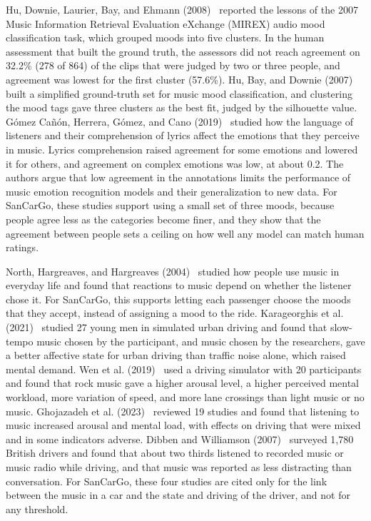 Hu, Downie, Laurier, Bay, and Ehmann (2008)~\cite{hu2008mirex} reported the lessons of the 2007 Music Information Retrieval Evaluation eXchange (MIREX) audio mood classification task, which grouped moods into five clusters. In the human assessment that built the ground truth, the assessors did not reach agreement on 32.2\% (278 of 864) of the clips that were judged by two or three people, and agreement was lowest for the first cluster (57.6\%). Hu, Bay, and Downie (2007)~\cite{hu2007simplified} built a simplified ground-truth set for music mood classification, and clustering the mood tags gave three clusters as the best fit, judged by the silhouette value. G{\'o}mez Ca{\~n}{\'o}n, Herrera, G{\'o}mez, and Cano (2019)~\cite{gomez2019emotions} studied how the language of listeners and their comprehension of lyrics affect the emotions that they perceive in music. Lyrics comprehension raised agreement for some emotions and lowered it for others, and agreement on complex emotions was low, at about 0.2. The authors argue that low agreement in the annotations limits the performance of music emotion recognition models and their generalization to new data. For SanCarGo, these studies support using a small set of three moods, because people agree less as the categories become finer, and they show that the agreement between people sets a ceiling on how well any model can match human ratings.

North, Hargreaves, and Hargreaves (2004)~\cite{north2004uses} studied how people use music in everyday life and found that reactions to music depend on whether the listener chose it. For SanCarGo, this supports letting each passenger choose the moods that they accept, instead of assigning a mood to the ride. Karageorghis et al. (2021)~\cite{karageorghis2021participant} studied 27 young men in simulated urban driving and found that slow-tempo music chosen by the participant, and music chosen by the researchers, gave a better affective state for urban driving than traffic noise alone, which raised mental demand. Wen et al. (2019)~\cite{wen2019music} used a driving simulator with 20 participants and found that rock music gave a higher arousal level, a higher perceived mental workload, more variation of speed, and more lane crossings than light music or no music. Ghojazadeh et al. (2023)~\cite{ghojazadeh2023music} reviewed 19 studies and found that listening to music increased arousal and mental load, with effects on driving that were mixed and in some indicators adverse. Dibben and Williamson (2007)~\cite{dibben2007invehicle} surveyed 1,780 British drivers and found that about two thirds listened to recorded music or music radio while driving, and that music was reported as less distracting than conversation. For SanCarGo, these four studies are cited only for the link between the music in a car and the state and driving of the driver, and not for any threshold.

